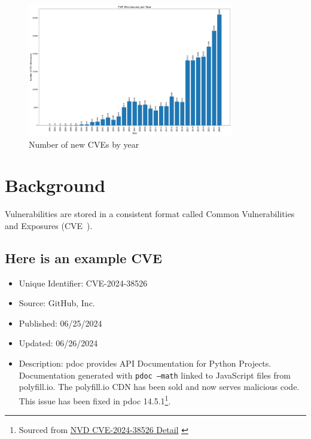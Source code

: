 \documentclass[12pt]{article}
\begin{document}
\begin{figure}[ht] \centering
	\includegraphics[width=0.8\textwidth]{figures/cves_per_year.pdf}
	\caption{\label{fig:cves_per_year}Number of new CVEs by year}
\end{figure}


\section{Background} \label{sec:background}

Vulnerabilities are stored in a consistent format called Common Vulnerabilities and
Exposures (CVE~\cite{CVE}).

\subsection{Here is an example CVE}
\begin{itemize}

	\item   Unique Identifier: CVE-2024-38526

	\item   Source: GitHub, Inc.

	\item   Published: 06/25/2024

	\item   Updated: 06/26/2024

	\item   Description: pdoc provides API Documentation for Python Projects. Documentation
	      generated with \texttt{pdoc --math} linked to JavaScript files from polyfill.io. The
	      polyfill.io CDN has been sold and now serves malicious code. This issue has been fixed in
	      pdoc 14.5.1\footnote{ Sourced from
		      \href{https://nvd.nist.gov/vuln/detail/CVE-2024-38526}{NVD CVE-2024-38526 Detail}
		      \cite{polyfill}}. \\

\end{itemize}
\end{document}
